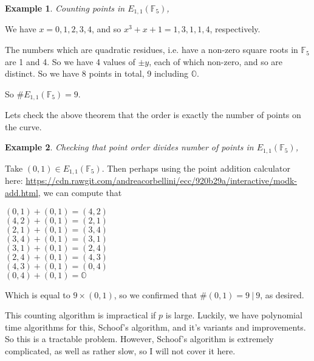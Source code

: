 \documentclass[]{article}
\newtheorem{benexample}{Example}
\newcommand{\OS}{\mathbb{O}}
\newcommand{\F}{\mathbb{F}}
\begin{document}
\begin{mdframed}[linewidth=2pt]
	\noindent \begin{benexample}
		Counting points in $E_{1,1}(\F_5)$,
	\end{benexample}

	\noindent We have $x = 0,1,2,3,4$, and so $x^3+x+1 = 1,3,1,1,4$, respectively.

	\noindent The numbers which are quadratic residues, i.e. have a non-zero square roots in $\F_5$ are 1 and 4. So we have 4 values of $\pm y$, each of which non-zero, and so are distinct. So we have 8 points in total, 9 including $\OS$.

	\noindent So $\# E_{1,1}(\F_5) = 9$.
\end{mdframed}

Lets check the above theorem that the order is exactly the number of points on the curve.


\begin{mdframed}[linewidth=2pt]
	\noindent \begin{benexample}
		Checking that point order divides number of points in $E_{1,1}(\F_5)$,
	\end{benexample}

	\noindent Take $(0,1) \in E_{1,1}(\F_5)$. Then perhaps using the point addition calculator here: \url{https://cdn.rawgit.com/andreacorbellini/ecc/920b29a/interactive/modk-add.html}, we can compute that

	\noindent $(0,1)+(0,1) = (4,2)$
\\
	$(4,2)+(0,1) = (2,1)$
\\
	$(2,1)+(0,1) = (3,4)$
\\
	$(3,4)+(0,1) = (3,1)$
\\
	$(3,1)+(0,1) = (2,4)$
\\
	$(2,4)+(0,1) = (4,3)$
\\
	$(4,3)+(0,1) = (0,4)$
	\\
	$(0,4)+(0,1) = \OS$


	\noindent Which is equal to $9 \times (0,1)$, so we confirmed that $\# (0,1) = 9\ |\ 9$, as desired.

\end{mdframed}

This counting algorithm is impractical if $p$ is large. Luckily, we have polynomial time algorithms for this, Schoof's algorithm, and it's variants and improvements. So this is a tractable problem. However, Schoof's algorithm is extremely complicated, as well as rather slow, so I will not cover it here.
\end{document}
